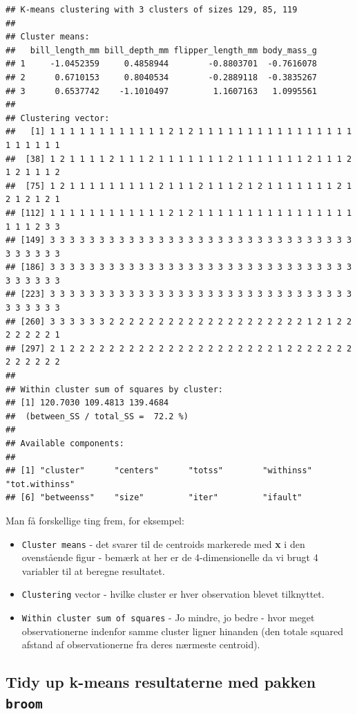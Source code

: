 \documentclass[
]{book}
\providecommand{\tightlist}{%
  \setlength{\itemsep}{0pt}\setlength{\parskip}{0pt}}
\begin{document}
\begin{verbatim}
## K-means clustering with 3 clusters of sizes 129, 85, 119
## 
## Cluster means:
##   bill_length_mm bill_depth_mm flipper_length_mm body_mass_g
## 1     -1.0452359     0.4858944        -0.8803701  -0.7616078
## 2      0.6710153     0.8040534        -0.2889118  -0.3835267
## 3      0.6537742    -1.1010497         1.1607163   1.0995561
## 
## Clustering vector:
##   [1] 1 1 1 1 1 1 1 1 1 1 1 1 2 1 2 1 1 1 1 1 1 1 1 1 1 1 1 1 1 1 1 1 1 1 1 1 1
##  [38] 1 2 1 1 1 1 2 1 1 1 2 1 1 1 1 1 1 1 2 1 1 1 1 1 1 1 2 1 1 1 2 1 2 1 1 1 2
##  [75] 1 2 1 1 1 1 1 1 1 1 1 2 1 1 1 2 1 1 1 2 1 2 1 1 1 1 1 1 1 2 1 2 1 2 1 2 1
## [112] 1 1 1 1 1 1 1 1 1 1 1 1 2 1 2 1 1 1 1 1 1 1 1 1 1 1 1 1 1 1 1 1 1 1 2 3 3
## [149] 3 3 3 3 3 3 3 3 3 3 3 3 3 3 3 3 3 3 3 3 3 3 3 3 3 3 3 3 3 3 3 3 3 3 3 3 3
## [186] 3 3 3 3 3 3 3 3 3 3 3 3 3 3 3 3 3 3 3 3 3 3 3 3 3 3 3 3 3 3 3 3 3 3 3 3 3
## [223] 3 3 3 3 3 3 3 3 3 3 3 3 3 3 3 3 3 3 3 3 3 3 3 3 3 3 3 3 3 3 3 3 3 3 3 3 3
## [260] 3 3 3 3 3 3 2 2 2 2 2 2 2 2 2 2 2 2 2 2 2 2 2 2 2 2 1 2 1 2 2 2 2 2 2 2 1
## [297] 2 1 2 2 2 2 2 2 2 2 2 2 2 2 2 2 2 2 2 2 2 2 2 1 2 2 2 2 2 2 2 2 2 2 2 2 2
## 
## Within cluster sum of squares by cluster:
## [1] 120.7030 109.4813 139.4684
##  (between_SS / total_SS =  72.2 %)
## 
## Available components:
## 
## [1] "cluster"      "centers"      "totss"        "withinss"     "tot.withinss"
## [6] "betweenss"    "size"         "iter"         "ifault"
\end{verbatim}

Man få forskellige ting frem, for eksempel:

\begin{itemize}
\tightlist
\item
  \texttt{Cluster\ means} - det svarer til de centroids markerede med \textbf{x} i den ovenstående figur - bemærk at her er de 4-dimensionelle da vi brugt 4 variabler til at beregne resultatet.
\item
  \texttt{Clustering} vector - hvilke cluster er hver observation blevet tilknyttet.
\item
  \texttt{Within\ cluster\ sum\ of\ squares} - Jo mindre, jo bedre - hvor meget observationerne indenfor samme cluster ligner hinanden (den totale squared afstand af observationerne fra deres nærmeste centroid).
\end{itemize}

\hypertarget{tidy-up-k-means-resultaterne-med-pakken-broom}{%
\subsection{\texorpdfstring{Tidy up k-means resultaterne med pakken \texttt{broom}}{Tidy up k-means resultaterne med pakken broom}}\label{tidy-up-k-means-resultaterne-med-pakken-broom}}
\end{document}

